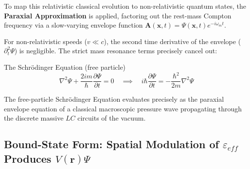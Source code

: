 To map this relativistic classical evolution to non-relativistic quantum states, the \textbf{Paraxial Approximation} is applied, factoring out the rest-mass Compton frequency via a slow-varying envelope function $\mathbf{A}(\mathbf{x},t) = \Psi(\mathbf{x},t) e^{-i \omega_m t}$. 

For non-relativistic speeds ($v \ll c$), the second time derivative of the envelope ($\partial_t^2 \Psi$) is negligible. The strict mass resonance terms precisely cancel out:
\begin{resultbox}{The Schr\"odinger Equation (free particle)}
\begin{equation}
    \nabla^2 \Psi + \frac{2im}{\hbar} \frac{\partial \Psi}{\partial t} = 0 \quad \implies \quad i\hbar \frac{\partial \Psi}{\partial t} = -\frac{\hbar^2}{2m} \nabla^2 \Psi
\end{equation}
\end{resultbox}
The free-particle Schr\"odinger Equation evaluates precisely as the paraxial envelope equation of a classical macroscopic pressure wave propagating through the discrete massive $LC$ circuits of the vacuum.

\subsection{Bound-State Form: Spatial Modulation of $\varepsilon_{eff}$ Produces $V(\mathbf{r})\Psi$}

